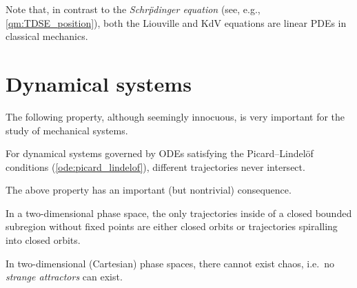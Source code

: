     \begin{remark}[Linearity]
        Note that, in contrast to the \textit{Schr\"pdinger equation} (see, e.g., \cref{qm:TDSE_position}), both the Liouville and KdV equations are linear PDEs in classical mechanics.
    \end{remark}


\section{Dynamical systems}

    The following property, although seemingly innocuous, is very important for the study of mechanical systems.
    \begin{property}
        For dynamical systems governed by ODEs satisfying the Picard--Lindel\"of conditions (\cref{ode:picard_lindelof}), different trajectories never intersect.
    \end{property}

    The above property has an important (but nontrivial) consequence.
    \begin{theorem}
        In a two-dimensional phase space, the only trajectories inside of a closed bounded subregion without fixed points are either closed orbits or trajectories spiralling into closed orbits.
    \end{theorem}
    \begin{result}
        In two-dimensional (Cartesian) phase spaces, there cannot exist chaos, i.e.~no \textit{strange attractors} can exist.
    \end{result}




